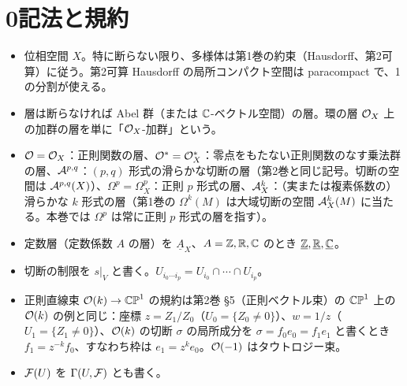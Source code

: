 \section*{0\quad 記法と規約}
\begin{itemize}
\item 位相空間 $X$。特に断らない限り、多様体は第1巻の約束（Hausdorff、第2可算）に従う。第2可算 Hausdorff の局所コンパクト空間は paracompact で、1の分割が使える。
\item 層は断らなければ Abel 群（または $\mathbb C$-ベクトル空間）の層。環の層 $\mathcal O_X$ 上の加群の層を単に「$\mathcal O_X$-加群」という。
\item $\mathcal O=\mathcal O_X$：正則関数の層、$\mathcal O^*=\mathcal O^*_X$：零点をもたない正則関数のなす乗法群の層、$\mathcal A^{p,q}$：$(p,q)$ 形式の滑らかな切断の層（第2巻と同じ記号。切断の空間は $\mathcal A^{p,q}(X)$）、$\Omega^p=\Omega^p_X$：正則 $p$ 形式の層、$\mathcal A^k_X$：（実または複素係数の）滑らかな $k$ 形式の層（第1巻の $\Omega^k(M)$ は大域切断の空間 $\mathcal A^k_X(M)$ に当たる。本巻では $\Omega^p$ は常に正則 $p$ 形式の層を指す）。
\item 定数層（定数係数 $A$ の層）を $\underline A_X$、$A=\mathbb Z,\mathbb R,\mathbb C$ のとき $\underline{\mathbb Z},\underline{\mathbb R},\underline{\mathbb C}$。
\item 切断の制限を $s|_V$ と書く。$U_{i_0\cdots i_p}=U_{i_0}\cap\cdots\cap U_{i_p}$。
\item 正則直線束 $\mathcal O(k)\to\mathbb{CP}^1$ の規約は第2巻 §5（正則ベクトル束）の $\mathbb{CP}^1$ 上の $\mathcal O(k)$ の例と同じ：座標 $z=Z_1/Z_0$（$U_0=\{Z_0\ne0\}$）、$w=1/z$（$U_1=\{Z_1\ne0\}$）、$\mathcal O(k)$ の切断 $\sigma$ の局所成分を $\sigma=f_0e_0=f_1e_1$ と書くとき $f_1=z^{-k}f_0$、すなわち枠は $e_1=z^{k}e_0$。$\mathcal O(-1)$ はタウトロジー束。
\item $\mathcal F(U)$ を $\Gamma(U,\mathcal F)$ とも書く。
\end{itemize}

